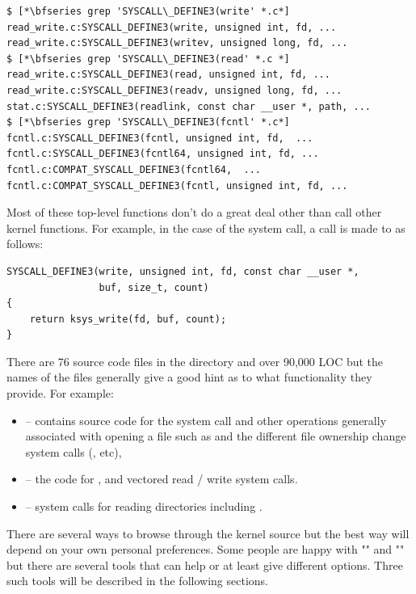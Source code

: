 \begin{lstlisting}
$ [*\bfseries grep 'SYSCALL\_DEFINE3(write' *.c*]
read_write.c:SYSCALL_DEFINE3(write, unsigned int, fd, ...
read_write.c:SYSCALL_DEFINE3(writev, unsigned long, fd, ...
$ [*\bfseries grep 'SYSCALL\_DEFINE3(read' *.c *]
read_write.c:SYSCALL_DEFINE3(read, unsigned int, fd, ...
read_write.c:SYSCALL_DEFINE3(readv, unsigned long, fd, ...
stat.c:SYSCALL_DEFINE3(readlink, const char __user *, path, ...
$ [*\bfseries grep 'SYSCALL\_DEFINE3(fcntl' *.c*]
fcntl.c:SYSCALL_DEFINE3(fcntl, unsigned int, fd,  ...
fcntl.c:SYSCALL_DEFINE3(fcntl64, unsigned int, fd, ...
fcntl.c:COMPAT_SYSCALL_DEFINE3(fcntl64,  ...
fcntl.c:COMPAT_SYSCALL_DEFINE3(fcntl, unsigned int, fd, ...
\end{lstlisting}

\noindent
Most of these top-level functions don't do a great deal other than call other kernel functions. For example, in the case of the  system call, a call is made to  as follows:

\begin{lstlisting}
SYSCALL_DEFINE3(write, unsigned int, fd, const char __user *, 
                buf, size_t, count)
{
    return ksys_write(fd, buf, count);
}
\end{lstlisting}

\noindent
There are 76 source code files in the  directory and over 90,000 LOC but the names of the files generally give a good hint as to what functionality they provide. For example:

\begin{itemize}
	\item {} -- contains source code for the  system call and other operations generally associated 
		with opening a file such as   and the different file ownership change system calls 
		(,  etc), 
	\item {} -- the code for ,  and vectored read / write system calls.
	\item {} -- system calls for reading directories including .
\end{itemize}

\noindent
There are several ways to browse through the kernel source but the best way will depend on your own personal preferences. Some people are happy with "" and "" but there are several tools that can help or at least give different options. Three such tools will be described in the following sections.


